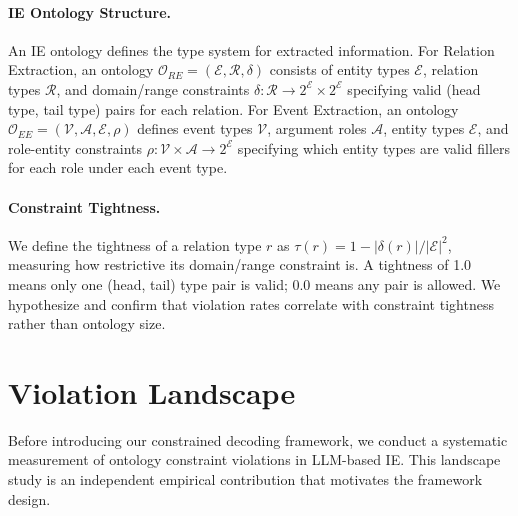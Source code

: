 \documentclass[11pt,a4paper]{article}
\begin{document}
\paragraph{IE Ontology Structure.}
An IE ontology defines the type system for extracted information. For Relation Extraction, an ontology $\mathcal{O}_{RE} = (\mathcal{E}, \mathcal{R}, \delta)$ consists of entity types $\mathcal{E}$, relation types $\mathcal{R}$, and domain/range constraints $\delta: \mathcal{R} \to 2^{\mathcal{E}} \times 2^{\mathcal{E}}$ specifying valid (head type, tail type) pairs for each relation. For Event Extraction, an ontology $\mathcal{O}_{EE} = (\mathcal{V}, \mathcal{A}, \mathcal{E}, \rho)$ defines event types $\mathcal{V}$, argument roles $\mathcal{A}$, entity types $\mathcal{E}$, and role-entity constraints $\rho: \mathcal{V} \times \mathcal{A} \to 2^{\mathcal{E}}$ specifying which entity types are valid fillers for each role under each event type.

\paragraph{Constraint Tightness.}
We define the tightness of a relation type $r$ as $\tau(r) = 1 - |\delta(r)| / |\mathcal{E}|^2$, measuring how restrictive its domain/range constraint is. A tightness of 1.0 means only one (head, tail) type pair is valid; 0.0 means any pair is allowed. We hypothesize and confirm that violation rates correlate with constraint tightness rather than ontology size.

\section{Violation Landscape}
\label{sec:landscape}

Before introducing our constrained decoding framework, we conduct a systematic measurement of ontology constraint violations in LLM-based IE. This landscape study is an independent empirical contribution that motivates the framework design.
\end{document}
